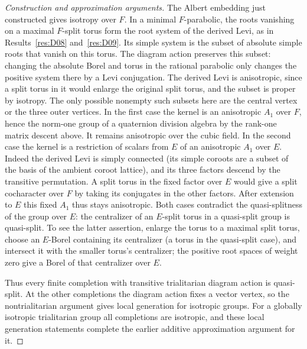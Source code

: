 \documentclass[11pt,a4paper,openany,oneside]{book}
\theoremstyle{resultstyle}
\theoremstyle{definition}
\numberwithin{equation}{chapter}
\begin{document}
\begin{proof}[Construction and approximation arguments]
The Albert embedding just constructed gives isotropy over \(F\).
In a minimal \(F\)-parabolic, the roots vanishing on
a maximal \(F\)-split torus form the root system
of the derived Levi, as in
Results~\ref{res:D08} and~\ref{res:D09}. Its simple
system is the subset of absolute simple roots
that vanish on this torus. The diagram action preserves this
subset: changing the absolute Borel and torus in the
rational parabolic only changes the positive system
there by a Levi conjugation. The derived Levi is
anisotropic, since a split torus in it would enlarge
the original split torus, and the subset is proper by
isotropy. The only possible nonempty such subsets here
are the central vertex or the three outer vertices.
In the first case the kernel is an anisotropic \(A_1\)
over \(F\), hence the norm-one group of a quaternion
division algebra by the rank-one matrix descent above.
It remains anisotropic over the cubic field. In the
second case the kernel is a restriction of scalars
from \(E\) of an anisotropic \(A_1\) over \(E\). Indeed
the derived Levi is simply connected (its simple
coroots are a subset of the basis of the ambient
coroot lattice), and its three factors descend by the
transitive permutation. A split torus in the fixed
factor over \(E\) would give a split cocharacter over
\(F\) by taking its conjugates in the other factors.
After extension to \(E\) this fixed \(A_1\) thus stays
anisotropic. Both cases contradict the quasi-splitness
of the group over \(E\): the centralizer of an
\(E\)-split torus in a quasi-split group is quasi-split.
To see the latter assertion, enlarge the torus to a
maximal split torus, choose an \(E\)-Borel containing
its centralizer (a torus in the quasi-split case),
and intersect it with the smaller torus's centralizer;
the positive root spaces of weight zero give a Borel
of that centralizer over \(E\).

Thus every finite completion with transitive trialitarian
diagram action is quasi-split. At the other completions the
diagram action fixes a vector vertex, so the nontrialitarian
argument gives local generation for isotropic groups. For a
globally isotropic trialitarian group all completions are
isotropic, and these local generation statements complete
the earlier additive approximation argument for it.


\end{proof}
\end{document}
